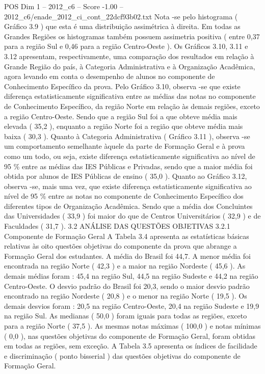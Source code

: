 \begin{textsample}{POS Dim 1 – 2012\_c6 – Score -1.00 – 2012\_c6/enade\_2012\_ci\_cont\_22dcf93b02.txt}
Nota -se pelo histograma ( Gráfico 3.9 ) que esta é uma distribuição assimétrica à direita.
Em todas as Grandes Regiões os histogramas também possuem assimetria positiva ( entre 0,37 para a região Sul e 0,46 para a região Centro-Oeste ).
Os Gráficos 3.10, 3.11 e 3.12 apresentam, respectivamente, uma comparação dos resultados em relação à Grande Região do país, à Categoria Administrativa e à Organização Acadêmica, agora levando em conta o desempenho de alunos no componente de Conhecimento Específico da prova.
Pelo Gráfico 3.10, observa -se que existe diferença estatisticamente significativa entre as médias das notas no componente de Conhecimento Específico, da região Norte em relação às demais regiões, exceto a região Centro-Oeste.
Sendo que a região Sul foi a que obteve média mais elevada ( 35,2 ), enquanto a região Norte foi a região que obteve média mais baixa ( 30,3 ).
Quanto à Categoria Administrativa ( Gráfico 3.11 ), observa -se um comportamento semelhante àquele da parte de Formação Geral e à prova como um todo, ou seja, existe diferença estatisticamente significativa ao nível de 95 \% entre as médias das IES Públicas e Privadas, sendo que a maior média foi obtida por alunos de IES Públicas de ensino ( 35,0 ).
Quanto ao Gráfico 3.12, observa -se, mais uma vez, que existe diferença estatisticamente significativa ao nível de 95 \% entre as notas no componente de Conhecimento Específico dos diferentes tipos de Organização Acadêmica.
Sendo que a média dos Concluintes das Universidades ( 33,9 ) foi maior do que de Centros Universitários ( 32,9 ) e de Faculdades ( 31,7 ). 3.2 ANÁLISE DAS QUESTÕES OBJETIVAS 3.2.1 Componente de Formação Geral A Tabela 3.4 apresenta as estatísticas básicas relativas às oito questões objetivas do componente da prova que abrange a Formação Geral dos estudantes.
A média do Brasil foi 44,7.
A menor média foi encontrada na região Norte ( 42,3 ) e a maior na região Nordeste ( 45,6 ).
As demais médias foram : 45,4 na região Sul, 44,5 na região Sudeste e 44,2 na região Centro-Oeste.
O desvio padrão do Brasil foi 20,3, sendo o maior desvio padrão encontrado na região Nordeste ( 20,8 ) e o menor na região Norte ( 19,5 ).
Os demais desvios foram : 20,5 na região Centro-Oeste, 20,4 na região Sudeste e 19,9 na região Sul.
As medianas ( 50,0 ) foram iguais para todas as regiões, exceto para a região Norte ( 37,5 ).
As mesmas notas máximas ( 100,0 ) e notas mínimas ( 0,0 ), nas questões objetivas do componente de Formação Geral, foram obtidas em todas as regiões, sem exceção.
A Tabela 3.5 apresenta os índices de facilidade e discriminação ( ponto bisserial ) das questões objetivas do componente de Formação Geral.

\end{textsample}
